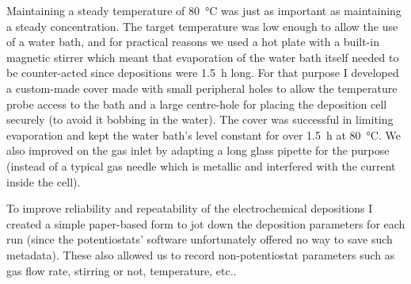 \documentclass[webedition,openright,titles,swedish,english]{LuaUUThesis}\usepackage[]{graphicx}\usepackage[]{xcolor}
\newcommand{\etc}{etc.}
\begin{document}
Maintaining a steady temperature of \qty{80}{\celsius} was just as important
as maintaining a steady  concentration.
The target temperature was low enough to allow the use of a water bath,
and for practical reasons we used a hot plate with a built-in magnetic stirrer
which meant that evaporation of the water bath itself needed to
be counter-acted since depositions were \qty{1.5}{\hour} long.
For that purpose I developed a custom-made cover made with small peripheral holes to allow
the temperature probe access to the bath and a large centre-hole for placing the
deposition cell securely (to avoid it bobbing in the water).
The cover was successful in limiting evaporation and kept the
water bath's level constant for over \qty{1.5}{\hour} at \qty{80}{\celsius}.
We also improved on the gas inlet by adapting a long glass pipette for the
purpose (instead of a typical gas needle which is metallic and interfered with
the current inside the cell).

To improve reliability and repeatability of the electrochemical depositions
I created a simple paper-based form to jot down the deposition parameters for each run
(since the potentiostats' software unfortunately offered no way to save such metadata).
These 
also allowed us to record non-potentiostat parameters
such as gas flow rate, stirring or not, temperature, \etc.


%
\end{document}

